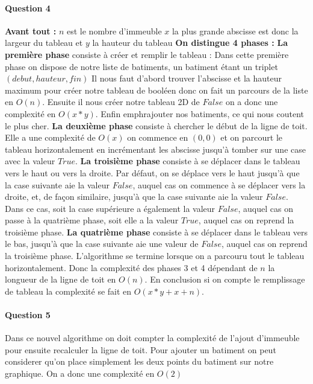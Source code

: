 \documentclass[a4paper,10pt]{article}
\begin{document}
\paragraph{Question 4}
\textbf{Avant tout :} $n$ est le nombre d'immeuble $x$ la plus grande abscisse est donc la largeur du tableau et $y$ la hauteur du tableau\newline
\textbf{On distingue 4 phases :} \newline
\textbf{La première phase} consiste à créer et remplir le tableau :\newline
Dans cette première phase on dispose de notre liste de batiments, un batiment étant un triplet $(debut, hauteur, fin)$\newline
Il nous faut d'abord trouver l'abscisse et la hauteur maximum pour créer notre tableau de booléen donc on fait un parcours de la liste en $O(n)$. 
Ensuite il nous créer notre tableau 2D de $False$ on a donc une complexité en $O(x*y)$.
Enfin emph{rajouter nos batiments, ce qui nous coutent le plus cher}. 
\textbf{La deuxième phase} consiste à chercher le début de la ligne de toit. Elle a une complexité de $O(x)$ on commence en $(0,0)$ et 
on parcourt le tableau horizontalement en incrémentant les abscisse jusqu'à tomber sur une case avec la valeur $True$.\newline
\textbf{La troisième phase} consiste à se déplacer dans le tableau vers le haut ou vers la droite. Par défaut, on se déplace vers le haut jusqu'à que la case suivante aie la valeur $False$, 
auquel cas on commence à se déplacer vers la droite, et, de façon similaire, jusqu'à que la case suivante aie la valeur $False$. 
Dans ce cas, soit la case supérieure a également la valeur $False$, auquel cas on passe à la quatrième phase, soit elle a la valeur $True$, auquel cas on reprend la troisième phase.\newline
\textbf{La quatrième phase} consiste à se déplacer dans le tableau vers le bas, jusqu'à que la case suivante aie une valeur de $False$, auquel cas on reprend la troisième phase.\newline
L'algorithme se termine lorsque on a parcouru tout le tableau horizontalement.\newline
Donc la complexité des phases 3 et 4 dépendant de $n$ la longueur de la ligne de toit en $O(n)$.
En conclusion si on compte le remplissage de tableau la complexité se fait en $O(x*y + x + n)$.
\paragraph{Question 5}
Dans ce nouvel algorithme on doit compter la complexité de l'ajout d'immeuble pour ensuite recalculer la ligne de toit.
Pour ajouter un batiment on peut considerer qu'on place simplement les deux points du batiment sur notre graphique. 
On a donc une complexité en $O(2)$
\end{document}
